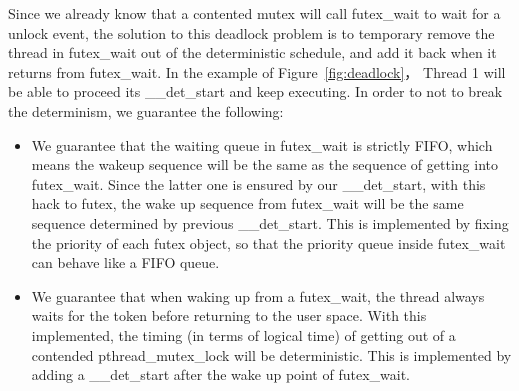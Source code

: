 Since we already know that a contented mutex will call futex\_wait to wait for a unlock event, the solution to this deadlock problem is to temporary remove the thread in futex\_wait out of the deterministic schedule, and add it back when it returns from futex\_wait. In the example of Figure~\ref{fig:deadlock}， Thread 1 will be able to proceed its \_\_det\_start and keep executing. In order to not to break the determinism, we guarantee the following:
\begin{itemize}
\item We guarantee that the waiting queue in futex\_wait is strictly FIFO, which means the wakeup sequence will be the same as the sequence of getting into futex\_wait. Since the latter one is ensured by our \_\_det\_start, with this hack to futex, the wake up sequence from futex\_wait will be the same sequence determined by previous \_\_det\_start. This is implemented by fixing the priority of each futex object, so that the priority queue inside futex\_wait can behave like a FIFO queue.
\item We guarantee that when waking up from a futex\_wait, the thread always waits for the token before returning to the user space. With this implemented, the timing (in terms of logical time) of getting out of a contended pthread\_mutex\_lock will be deterministic. This is implemented by adding a \_\_det\_start after the wake up point of futex\_wait.
\end{itemize}

